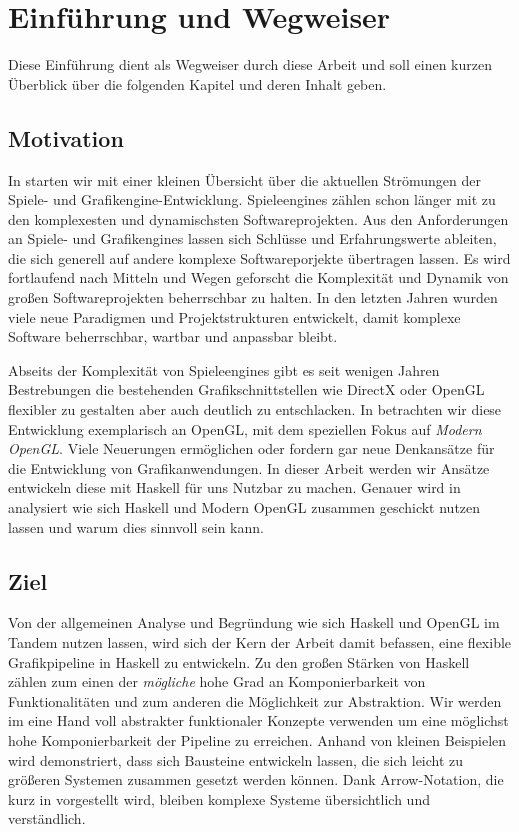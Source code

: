 \chapter{Einführung und Wegweiser}

Diese Einführung dient als Wegweiser durch diese Arbeit und soll einen kurzen Überblick über die folgenden Kapitel und deren Inhalt geben.

\section{Motivation}
In  starten wir mit einer kleinen Übersicht über die aktuellen Strömungen der Spiele- und Grafikengine-Entwicklung. Spieleengines zählen schon länger mit zu den komplexesten und dynamischsten Softwareprojekten. Aus den Anforderungen an Spiele- und Grafikengines lassen sich Schlüsse und Erfahrungswerte ableiten, die sich generell auf andere komplexe Softwareporjekte übertragen lassen. Es wird fortlaufend nach Mitteln und Wegen geforscht die Komplexität und Dynamik von großen Softwareprojekten beherrschbar zu halten. In den letzten Jahren wurden viele neue Paradigmen und Projektstrukturen entwickelt, damit komplexe Software beherrschbar, wartbar und anpassbar bleibt.

Abseits der Komplexität von Spieleengines gibt es seit wenigen Jahren Bestrebungen die bestehenden Grafikschnittstellen wie DirectX oder OpenGL flexibler zu gestalten aber auch deutlich zu entschlacken. In  betrachten wir diese Entwicklung exemplarisch an OpenGL, mit dem speziellen Fokus auf \textit{Modern OpenGL}. Viele Neuerungen ermöglichen oder fordern gar neue Denkansätze für die Entwicklung von Grafikanwendungen. In dieser Arbeit werden wir Ansätze entwickeln diese mit Haskell für uns Nutzbar zu machen. Genauer wird in  analysiert wie sich Haskell und Modern OpenGL zusammen geschickt nutzen lassen und warum dies sinnvoll sein kann.

\section{Ziel}
Von der allgemeinen Analyse und Begründung wie sich Haskell und OpenGL im Tandem nutzen lassen, wird sich der Kern der Arbeit damit befassen, eine flexible Grafikpipeline in Haskell zu entwickeln. Zu den großen Stärken von Haskell zählen zum einen der \textit{mögliche} hohe Grad an Komponierbarkeit von Funktionalitäten und zum anderen die Möglichkeit zur Abstraktion. Wir werden im  eine Hand voll abstrakter funktionaler Konzepte verwenden um eine möglichst hohe Komponierbarkeit der Pipeline zu erreichen. Anhand von kleinen Beispielen wird demonstriert, dass sich Bausteine entwickeln lassen, die sich leicht zu größeren Systemen zusammen gesetzt werden können. Dank Arrow-Notation, die kurz in  vorgestellt wird, bleiben komplexe Systeme übersichtlich und verständlich.

